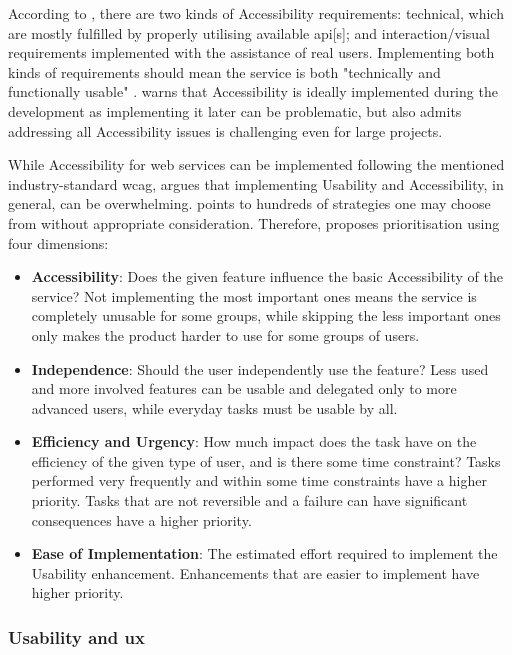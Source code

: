 \label{Kinds-of-Accessibility}
According to \textcite{WAI_Topics}, there are two kinds of Accessibility requirements: technical, which are mostly fulfilled by properly utilising available \gls{api}[s]; and interaction/visual requirements implemented with the assistance of real users.
Implementing both kinds of requirements should mean the service is both "technically and functionally usable" \parencite{WAI_Topics}.
\textcite{WAI_Topics} warns that Accessibility is ideally implemented during the development as implementing it later can be problematic, but also admits addressing all Accessibility issues is challenging even for large projects.

While Accessibility for web services can be implemented following the mentioned industry-standard \gls{wcag}, \textcite{Vanderheiden_2000} argues that implementing Usability and Accessibility, in general, can be overwhelming.
\textcite{Vanderheiden_2000} points to hundreds of strategies one may choose from without appropriate consideration.
Therefore, \textcite{Vanderheiden_2000} proposes prioritisation using four dimensions:

\begin{itemize}
    \item \textbf{Accessibility}: Does the given feature influence the basic Accessibility of the service? Not implementing the most important ones means the service is completely unusable for some groups, while skipping the less important ones only makes the product harder to use for some groups of users.
    \item \textbf{Independence}: Should the user independently use the feature? Less used and more involved features can be usable and delegated only to more advanced users, while everyday tasks must be usable by all.
    \item \textbf{Efficiency and Urgency}: How much impact does the task have on the efficiency of the given type of user, and is there some time constraint? Tasks performed very frequently and within some time constraints have a higher priority. Tasks that are not reversible and a failure can have significant consequences have a higher priority.
    \item \textbf{Ease of Implementation}: The estimated effort required to implement the Usability enhancement. Enhancements that are easier to implement have higher priority.
\end{itemize}

\subsubsection{Usability and \gls{ux}}

